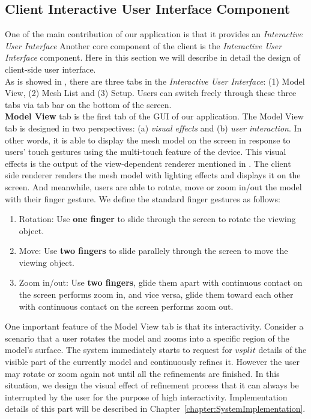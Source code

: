 \subsection{Client Interactive User Interface Component}
\label{section:clientintuicom}

One of the main contribution of our application is that it provides an \emph{Interactive User Interface} 
Another core component of the client is the \emph{Interactive User Interface} component. Here in this section we will describe in detail the design of client-side user interface. \\

As is showed in , there are three tabs in the \emph{Interactive User Interface}: (1) Model View, (2) Mesh List and (3) Setup. Users can switch freely through these three tabs via tab bar on the bottom of the screen.\\
\textbf{Model View} tab is the first tab of the GUI of our application. The Model View tab is designed in two perspectives: (a) \emph{visual effects} and (b) \emph{user interaction}. In other words, it is able to display the mesh model on the screen in response to users' touch gestures using the multi-touch feature of the device. This visual effects is the output of the view-dependent renderer mentioned in . The client side renderer renders the mesh model with lighting effects and displays it on the screen. And meanwhile, users are able to rotate, move or zoom in/out the model with their finger gesture. We define the standard finger gestures as follows:
\begin{enumerate}
\item
Rotation: Use \textbf{one finger} to slide through the screen to rotate the viewing object. 
\item
Move: Use \textbf{two fingers} to slide parallely through the screen to move the viewing object.
\item
Zoom in/out: Use \textbf{two fingers}, glide them apart with continuous contact on the screen performs zoom in, and vice versa, glide them toward each other with continuous contact on the screen performs zoom out. 
\end{enumerate}
One important feature of the Model View tab is that its interactivity. Consider a scenario that a user rotates the model and zooms into a specific region of the model's surface. The system immediately starts to request for $vsplit$ details of the visible part of the currently model and continuously refines it. However the user may rotate or zoom again not until all the refinements are finished. In this situation, we design the visual effect of refinement process that it can always be interrupted by the user for the purpose of high interactivity. Implementation details of this part will be described in Chapter~\ref{chapter:SystemImplementation}.\\
